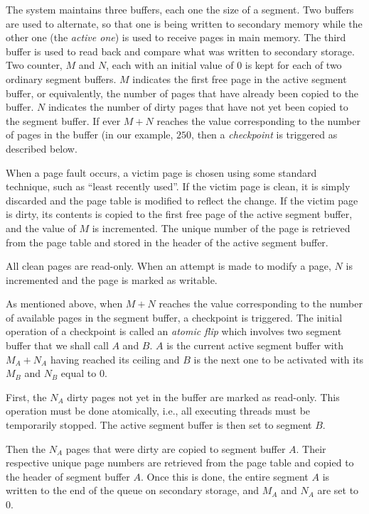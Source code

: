 The system maintains three buffers, each one the size of a segment.
Two buffers are used to alternate, so that one is being written to
secondary memory while the other one (the \emph{active one}) is used
to receive pages in main memory.  The third buffer is used to read
back and compare what was written to secondary storage.  Two counter,
$M$ and $N$, each with an initial value of $0$ is kept for each of two
ordinary segment buffers.  $M$ indicates the first free page in the
active segment buffer, or equivalently, the number of pages that have
already been copied to the buffer.  $N$ indicates the number of dirty
pages that have not yet been copied to the segment buffer.  If ever
$M+N$ reaches the value corresponding to the number of pages in the
buffer (in our example, $250$, then a \emph{checkpoint} is triggered
as described below.

When a page fault occurs, a victim page is chosen using some standard
technique, such as ``least recently used''.  If the victim page is
clean, it is simply discarded and the page table is modified to
reflect the change.  If the victim page is dirty, its contents is
copied to the first free page of the active segment buffer, and the
value of $M$ is incremented.  The unique number of the page is
retrieved from the page table and stored in the header of the active
segment buffer.

All clean pages are read-only.  When an attempt is made to modify a
page, $N$ is incremented and the page is marked as writable.

As mentioned above, when $M+N$ reaches the value corresponding to the
number of available pages in the segment buffer, a checkpoint is
triggered.  The initial operation of a checkpoint is called an
\emph{atomic flip} which involves two segment buffer that we shall
call $A$ and $B$.  $A$ is the current active segment buffer with $M_A+N_A$
having reached its ceiling and $B$ is the next one to be activated
with its $M_B$ and $N_B$ equal to $0$.

First, the $N_A$ dirty pages not yet in the buffer are
marked as read-only.  This operation must be done atomically, i.e.,
all executing threads must be temporarily stopped.  The active segment
buffer is then set to segment $B$.

Then the $N_A$ pages that were dirty are copied to segment buffer $A$.
Their respective unique page numbers are retrieved from the page table
and copied to the header of segment buffer $A$.  Once this is done,
the entire segment $A$ is written to the end of the queue on secondary
storage, and $M_A$ and $N_A$ are set to $0$.

